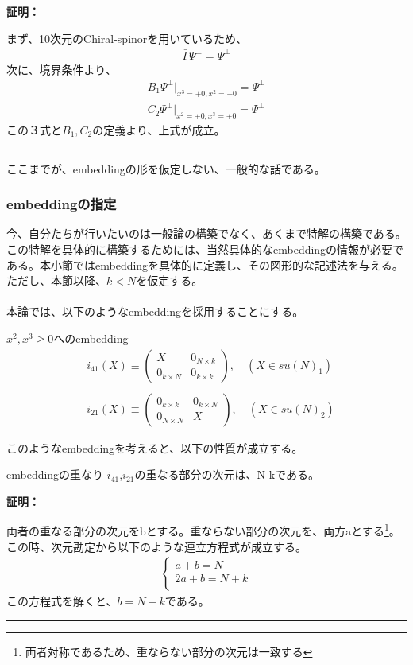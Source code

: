 \documentclass[dvipdfmx,a4paper,10.5pt]{article}
\numberwithin{equation}{section}
\newenvironment{proofbox}
{\begin{prooflabel}\textbf{証明：}\end{prooflabel}\vspace{0.8em}}
{\par\vspace{1em}\hrule\vspace{1em}}
\begin{document}
\begin{proofbox}
    まず、10次元のChiral-spinorを用いているため、
    \begin{align*}
        \bar{\Gamma}\Psi^{\perp}=\Psi^{\perp}
    \end{align*}
    次に、境界条件より、
    \begin{align*}
        B_{1}\Psi^{\perp}|_{x^{3}=+0,x^{2}= +0}=\Psi^{\perp}\\
        C_{2}\Psi^{\perp}|_{x^{2}=+0,x^{3}= +0}=\Psi^{\perp}
    \end{align*}
    この３式と$B_{1},C_{2}$の定義より、上式が成立。
\end{proofbox}
ここまでが、embeddingの形を仮定しない、一般的な話である。\\

\subsubsection{embeddingの指定}
今、自分たちが行いたいのは一般論の構築でなく、あくまで特解の構築である。この特解を具体的に構築するためには、当然具体的なembeddingの情報が必要である。本小節ではembeddingを具体的に定義し、その図形的な記述法を与える。\\
ただし、本節以降、$k<N$を仮定する。\\
\\
本論では、以下のようなembeddingを採用することにする。
\begin{defbox}{$x^{2},x^{3}\geq 0$へのembedding}
    \begin{align*}
    &i_{41}(X)\equiv 
    \begin{pmatrix}
        X & 0_{N\times k}\\
        0_{k\times N} & 0_{k\times k}
    \end{pmatrix},\quad(X\in su(N)_{1})\\
    \\
    & i_{21}(X)\equiv 
    \begin{pmatrix}
        0_{k\times k} & 0_{k\times N}\\
        0_{N\times N} & X
    \end{pmatrix},\quad(X\in su(N)_{2})
\end{align*}
\end{defbox}
このようなembeddingを考えると、以下の性質が成立する。
\begin{resultbox}{embeddingの重なり}
    $i_{41}$,$i_{21}$の重なる部分の次元は、N-kである。
\end{resultbox}
\begin{proofbox}
    両者の重なる部分の次元をbとする。重ならない部分の次元を、両方aとする\footnote{両者対称であるため、重ならない部分の次元は一致する}。
    この時、次元勘定から以下のような連立方程式が成立する。
    \begin{align*}
        \begin{cases}
            a+b=N\\
            2a+b=N+k\\
        \end{cases}
    \end{align*}
    この方程式を解くと、$b=N-k$である。
\end{proofbox}
\end{document}
